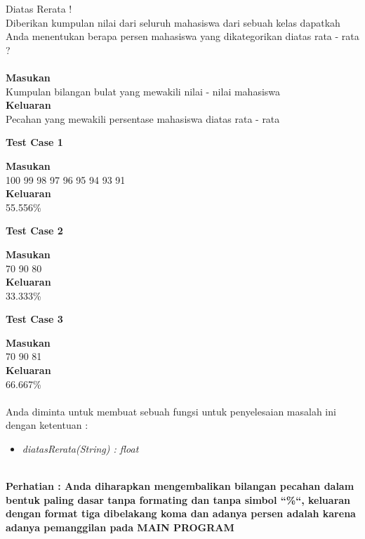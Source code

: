 \newpage

\begin{permasalahan}{Diatas Rerata !}\\
\label{prob:DiatasRerata}
	Diberikan kumpulan nilai dari seluruh mahasiswa dari sebuah kelas dapatkah Anda menentukan berapa persen
		mahasiswa yang dikategorikan diatas rata - rata ? \\\\
	\textbf{Masukan}\\
	Kumpulan bilangan bulat yang mewakili nilai - nilai mahasiswa \\
	\textbf{Keluaran}\\
	Pecahan yang mewakili persentase mahasiswa diatas rata - rata
	\begin{center}
	\textbf{Test Case 1}\\
	\end{center}
	\textbf{Masukan}\\
	100 99 98 97 96 95 94 93 91\\
	\textbf{Keluaran}\\
	55.556\%
	
	\begin{center}
	\textbf{Test Case 2}\\
	\end{center}
	\textbf{Masukan}\\
	70 90 80\\
	\textbf{Keluaran}\\
	33.333\%

	\begin{center}
	\textbf{Test Case 3}\\
	\end{center}
	\textbf{Masukan}\\
	70 90 81\\
	\textbf{Keluaran}\\
	66.667\% 	 \\\\

	
	Anda diminta untuk membuat sebuah fungsi untuk penyelesaian masalah ini dengan ketentuan : \\
	\begin{itemize}
		\item \textit{diatasRerata(String) : float}\\\\
	\end{itemize}
	
	
	\textbf{Perhatian : Anda diharapkan mengembalikan bilangan pecahan dalam bentuk paling dasar tanpa formating dan tanpa simbol ``\%``, keluaran dengan format tiga dibelakang koma dan adanya persen adalah karena adanya pemanggilan pada MAIN PROGRAM}
	
	
\end{permasalahan}

